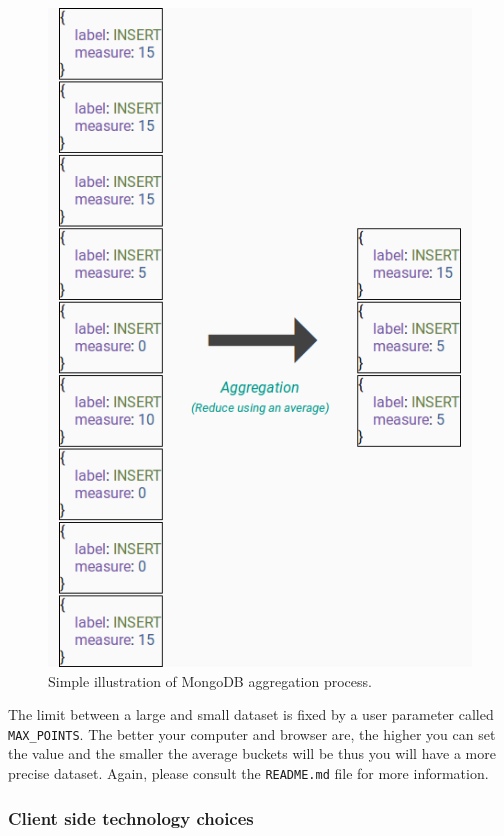 \documentclass[a4paper,11pt]{report}
\begin{document}
\begin{figure}[ht]
\begin{center}
\includegraphics[scale=0.5]{images/mongodb-agg.png}
\caption{Simple illustration of MongoDB aggregation process.}
\label{mongo_agg}
\end{center}
\end{figure}

The limit between a large and small dataset is fixed by a user parameter called \texttt{MAX\_POINTS}. The better your computer and browser are, the higher you can set the value and the smaller the average buckets will be thus you will have a more precise dataset. Again, please consult the \texttt{README.md} file for more information.

\subsubsection{Client side technology choices}
\end{document}
